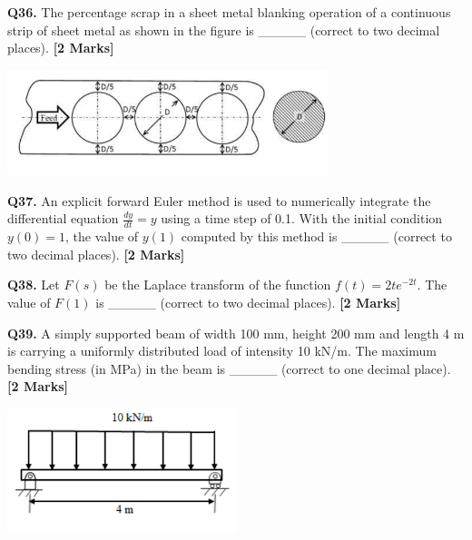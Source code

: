 \documentclass[11pt]{article}
\newcommand{\questionb}[2]{
    \noindent\textbf{Q#2.} #1 \hfill \textbf{[2 Marks]}
}
\begin{document}
\questionb{The percentage scrap in a sheet metal blanking operation of a continuous strip of sheet metal as shown in the figure is \_\_\_\_\_ (correct to two decimal places).}{36}
\begin{center}
\includegraphics[width=0.7\textwidth]{figures/36.png}
\end{center}
\vspace{0.5cm}

\questionb{An explicit forward Euler method is used to numerically integrate the differential equation \( \frac{dy}{dt} = y \) using a time step of 0.1. With the initial condition \( y(0) = 1 \), the value of \( y(1) \) computed by this method is \_\_\_\_\_ (correct to two decimal places).}{37}
\vspace{0.5cm}

\questionb{Let \( F(s) \) be the Laplace transform of the function \( f(t) = 2t e^{-2t} \). The value of \( F(1) \) is \_\_\_\_\_ (correct to two decimal places).}{38}
\vspace{0.5cm}

\questionb{A simply supported beam of width 100 mm, height 200 mm and length 4 m is carrying a uniformly distributed load of intensity 10 kN/m. The maximum bending stress (in MPa) in the beam is \_\_\_\_\_ (correct to one decimal place).}{39}
\begin{center}
\includegraphics[width=0.5\textwidth]{figures/39.png}
\end{center}
\vspace{0.5cm}
\end{document}
